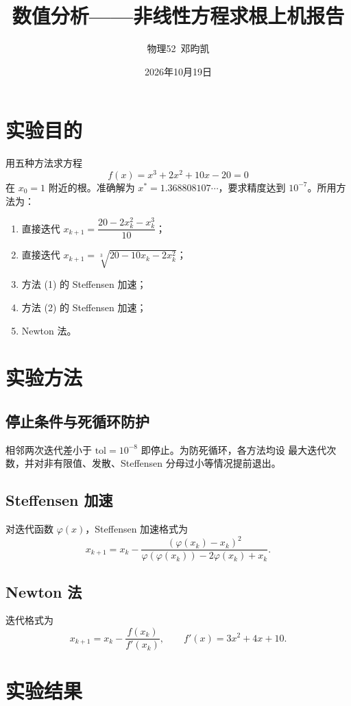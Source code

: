 \documentclass[UTF8]{ctexart}
\title{数值分析——非线性方程求根上机报告}
\author{物理52~邓昀凯}
\date{2026年10月19日}
\begin{document}
\maketitle

\section{实验目的}

用五种方法求方程
\[
f(x)=x^{3}+2x^{2}+10x-20=0
\]
在 $x_0=1$ 附近的根。准确解为 $x^*=1.368808107\cdots$，要求精度达到
$10^{-7}$。所用方法为：

\begin{enumerate}
  \item 直接迭代 $x_{k+1}=\dfrac{20-2x_k^2-x_k^3}{10}$；
  \item 直接迭代 $x_{k+1}=\sqrt[3]{20-10x_k-2x_k^2}$；
  \item 方法 (1) 的 Steffensen 加速；
  \item 方法 (2) 的 Steffensen 加速；
  \item Newton 法。
\end{enumerate}

\section{实验方法}

\subsection{停止条件与死循环防护}

相邻两次迭代差小于 $\text{tol}=10^{-8}$ 即停止。为防死循环，各方法均设
最大迭代次数，并对非有限值、发散、Steffensen 分母过小等情况提前退出。

\subsection{Steffensen 加速}

对迭代函数 $\varphi(x)$，Steffensen 加速格式为
\[
x_{k+1}=x_k-\frac{(\varphi(x_k)-x_k)^2}
{\varphi(\varphi(x_k))-2\varphi(x_k)+x_k}.
\]

\subsection{Newton 法}

迭代格式为
\[
x_{k+1}=x_k-\frac{f(x_k)}{f'(x_k)},\qquad
f'(x)=3x^2+4x+10.
\]

\section{实验结果}
\end{document}
